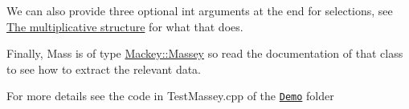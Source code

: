 We can also provide three optional {\ttfamily int} arguments at the end for selections, see \hyperlink{use_step1mult}{The multiplicative structure} for what that does.

Finally, {\ttfamily Mass} is of type {\ttfamily \hyperlink{classMackey_1_1Massey}{Mackey\+::\+Massey}} so read the documentation of that class to see how to extract the relevant data.

For more details see the code in Test\+Massey.\+cpp of the \href{https://github.com/NickG-Math/Mackey/tree/master/Demo}{\tt Demo} folder 